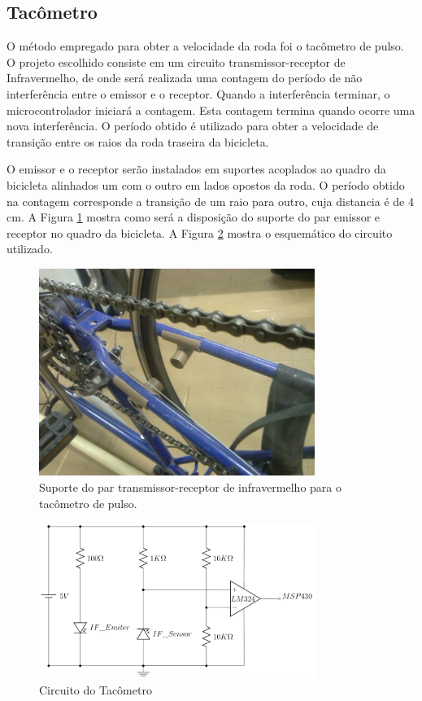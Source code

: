 \subsection{Tacômetro} %
\label{sub:tac_metro}

O método empregado para obter a velocidade da roda foi o tacômetro de pulso. O projeto escolhido consiste em um circuito transmissor-receptor de Infravermelho, de onde será realizada uma contagem do período de não interferência entre o emissor e o receptor. Quando a interferência terminar, o microcontrolador iniciará a contagem. Esta contagem termina quando ocorre uma nova interferência. O período obtido é utilizado para obter a velocidade de transição entre os raios da roda traseira da bicicleta.

O emissor e o receptor serão instalados em suportes acoplados ao quadro da bicicleta alinhados um com o outro em lados opostos da roda. O período obtido na contagem corresponde a transição de um raio para outro, cuja distancia é de 4 cm. A Figura \ref{fig:sens_tac} mostra como será a disposição do suporte do par emissor e receptor no quadro da bicicleta. A Figura \ref{fig:figuras_tacometro} mostra o esquemático do circuito utilizado.

\begin{figure}[h]
  \centering
  \includegraphics[width=0.8\textwidth]
      {figuras/sup_tac.jpg}
  \caption{Suporte do par transmissor-receptor de infravermelho para o tacômetro de pulso.}
  \label{fig:sens_tac}
\end{figure}

\begin{figure}[h]
  \centering
	\includegraphics[width=0.8\textwidth]{figuras/tacometro}
  \caption{Circuito do Tacômetro}
  \label{fig:figuras_tacometro}
\end{figure}

